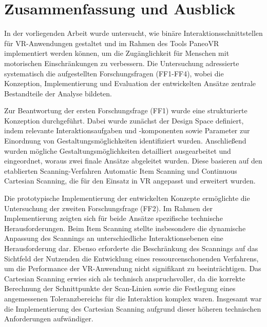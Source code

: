 \chapter{Zusammenfassung und Ausblick}
\label{chap:Fazit}

In der vorliegenden Arbeit wurde untersucht, wie binäre Interaktionsschnittstellen für VR-Anwendungen gestaltet und im Rahmen des Tools PaneoVR implementiert werden können, um die Zugänglichkeit für Menschen mit motorischen Einschränkungen zu verbessern. Die Untersuchung adressierte systematisch die aufgestellten Forschungsfragen (FF1-FF4), wobei die Konzeption, Implementierung und Evaluation der entwickelten Ansätze zentrale Bestandteile der Analyse bildeten.

Zur Beantwortung der ersten Forschungsfrage (FF1) wurde eine strukturierte Konzeption durchgeführt. Dabei wurde zunächst der Design Space definiert, indem relevante Interaktionsaufgaben und -komponenten sowie Parameter zur Einordnung von Gestaltungsmöglichkeiten identifiziert wurden. Anschließend wurden mögliche Gestaltungsmöglichkeiten detailliert ausgearbeitet und eingeordnet, woraus zwei finale Ansätze abgeleitet wurden. Diese basieren auf den etablierten Scanning-Verfahren Automatic Item Scanning und Continuous Cartesian Scanning, die für den Einsatz in VR angepasst und erweitert wurden.

Die prototypische Implementierung der entwickelten Konzepte ermöglichte die Untersuchung der zweiten Forschungsfrage (FF2). Im Rahmen der Implementierung zeigten sich für beide Ansätze spezifische technische Herausforderungen. Beim Item Scanning stellte insbesondere die dynamische Anpassung des Scannings an unterschiedliche Interaktionsebenen eine Herausforderung dar. Ebenso erforderte die Beschränkung des Scannings auf das Sichtfeld der Nutzenden die Entwicklung eines ressourcenschonenden Verfahrens, um die Performance der VR-Anwendung nicht signifikant zu beeinträchtigen. Das Cartesian Scanning erwies sich als technisch anspruchsvoller, da die korrekte Berechnung der Schnittpunkte der Scan-Linien sowie die Festlegung eines angemessenen Toleranzbereichs für die Interaktion komplex waren. Insgesamt war die Implementierung des Cartesian Scanning aufgrund dieser höheren technischen Anforderungen aufwändiger.

